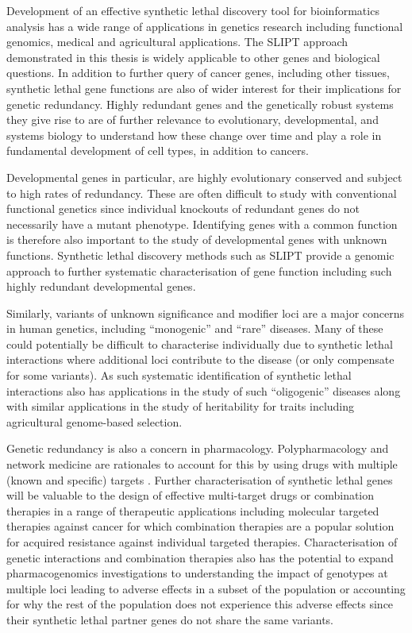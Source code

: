 Development of an effective synthetic lethal discovery tool for bioinformatics analysis has a wide range of applications in genetics research including functional genomics, medical and agricultural applications.  The \gls{SLIPT} approach demonstrated in this thesis is widely applicable to other genes and biological questions. In addition to further query of cancer genes, including other tissues, synthetic lethal gene functions are also of wider interest for their implications for genetic redundancy. Highly redundant genes and the genetically robust systems they give rise to are of further relevance to evolutionary, developmental, and systems biology to understand how these change over time and play a role in fundamental development of cell types, in addition to cancers.

Developmental genes in particular, are highly evolutionary conserved and subject to high rates of redundancy. These are often difficult to study with conventional functional genetics since individual knockouts of redundant genes do not necessarily have a mutant phenotype. Identifying genes with a common function is therefore also important to the study of developmental genes with unknown functions. Synthetic lethal discovery methods such as \gls{SLIPT} provide a genomic approach to further systematic characterisation of gene function including such highly redundant developmental genes.

Similarly, variants of unknown significance and modifier loci are a major concerns in human genetics, including ``monogenic'' and ``rare'' diseases. Many of these could potentially be difficult to characterise individually due to synthetic lethal interactions where additional loci contribute to the disease (or only compensate for some variants). As such systematic identification of synthetic lethal interactions also has applications in the study of such ``oligogenic'' diseases along with similar applications in the study of heritability for traits including agricultural genome-based selection.

Genetic redundancy is also a concern in pharmacology. Polypharmacology and network medicine are rationales to account for this by using drugs with multiple (known and specific) targets \citep{Hopkins2008, Barabasi2011}. Further characterisation of synthetic lethal genes will be valuable to the design of effective multi-target drugs or combination therapies in a range of therapeutic applications including molecular targeted therapies against cancer for which combination therapies are a popular solution for acquired resistance against individual targeted therapies. Characterisation of genetic interactions and combination therapies also has the potential to expand pharmacogenomics investigations to understanding the impact of genotypes at multiple loci leading to adverse effects in a subset of the population or accounting for why the rest of the population does not experience this adverse effects since their synthetic lethal partner genes do not share the same variants.


